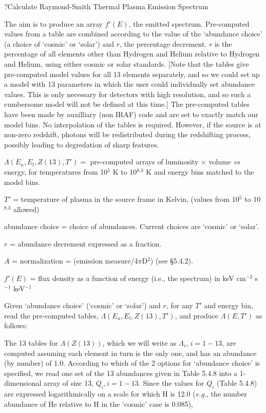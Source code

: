 \par\vfill\eject
 
\??Calculate Raymond-Smith Thermal Plasma Emission Spectrum

{\listlist
 

The aim is to produce an array $f'(E)$, the emitted spectrum.
Pre-computed
values from a table are combined according to the value of the
`abundance choice' (a choice of `cosmic' or `solar') and $r$, the
percentage decrement. $r$ is the
percentage of all elements other than Hydrogen and Helium relative
to Hydrogen and Helium, using either cosmic or solar standards.
[Note that the tables give pre-computed model values for all 13
elements
separately, and so we could set up a model with 13 parameters in which
the user could individually set abundance values.  This is only
necessary for detectors with high resolution, and so such a cumbersome
model will not be defined at this time.]
The pre-computed tables have been made by auxilliary (non IRAF) code
and are set to exactly match our model bins.  No interpolation of the
tables is required.  However, if the source is
at non-zero redshift, photons will be redistributed during the
redshifting process, possibly leading to degredation of sharp features.


 
$\Lambda(E_u,E_l,Z(13),T') =$ pre-computed arrays of luminosity
$\times$ volume {\it vs} energy, for temperatures from 10$^{5}$ K to
10$^{8.3}$ K and energy bins matched to the model bins.

$T'$ = temperature of plasma in the source frame in Kelvin, (values from 10$^{5}$ to
10$^{8.3}$ allowed)

abundance choice = choice of abundances. Current choices are `cosmic' or
`solar'.

$r$ = abundance decrement expressed as a fraction.
 
$A$ = normalization = (emission measure/4$\pi$D$^2$) (see \S5.4.2).


$f'(E)$ = flux density as a function of energy (i.e., the spectrum) in
keV cm$^{-2}$ s$^{-1}$ keV$^{-1}$

 
Given `abundance choice' (`cosmic' or `solar') and $r$, for any $T'$ and energy bin, read
the pre-computed
tables,  $\Lambda(E_u,E_l,Z(13),T')$, and produce
$\Lambda(E, T')$ as follows:

The 13 tables for $\Lambda(Z(13))$, which we will write as
$\Lambda_i$, $i=1-13$, are computed assuming each element
in turn is the only one, and has an abundance (by number) of 1.0.
According to which of the 2 options for `abundance choice' is specified,
we read one set of the 13 abundances given in Table 5.4.8
into a 1-dimensional array of size 13, $Q_i, i=1-13$. Since the values
for $Q_i$ (Table 5.4.8) are expressed logarithmically on a scale for
which H is 12.0 ({\it e.g.}, the number abundance of He relative to H in the
`cosmic' case is 0.085), 

}

